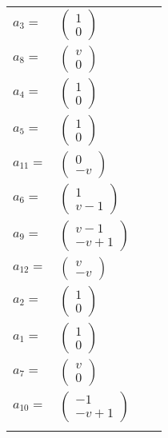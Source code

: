 \documentclass[1p]{elsarticle_modified}
\theoremstyle{definition}
\begin{document}
\begin{tabular}{m{7pt} m{180pt} m{7pt} m{180pt} }
\flushright $a_{3}=$&$\begin{pmatrix}1\\0\end{pmatrix}$ \\
\flushright $a_{8}=$&$\begin{pmatrix}v\\0\end{pmatrix}$ \\
\flushright $a_{4}=$&$\begin{pmatrix}1\\0\end{pmatrix}$ \\
\flushright $a_{5}=$&$\begin{pmatrix}1\\0\end{pmatrix}$ \\
\flushright $a_{11}=$&$\begin{pmatrix}0\\- v\end{pmatrix}$ \\
\flushright $a_{6}=$&$\begin{pmatrix}1\\v-1\end{pmatrix}$ \\
\flushright $a_{9}=$&$\begin{pmatrix}v-1\\- v+1\end{pmatrix}$ \\
\flushright $a_{12}=$&$\begin{pmatrix}v\\- v\end{pmatrix}$ \\
\flushright $a_{2}=$&$\begin{pmatrix}1\\0\end{pmatrix}$ \\
\flushright $a_{1}=$&$\begin{pmatrix}1\\0\end{pmatrix}$ \\
\flushright $a_{7}=$&$\begin{pmatrix}v\\0\end{pmatrix}$ \\
\flushright $a_{10}=$&$\begin{pmatrix}-1\\- v+1\end{pmatrix}$\\&\end{tabular}
\end{document}
